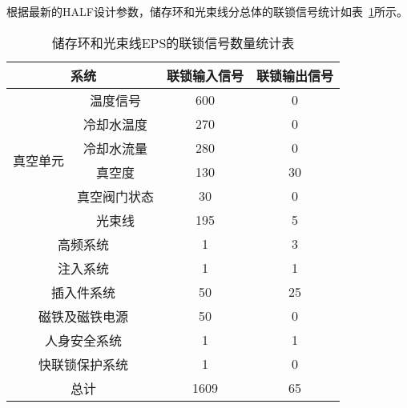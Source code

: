 根据最新的HALF设计参数，储存环和光束线分总体的联锁信号统计如表~\ref{table:4.3}所示。
\begin{table}[hbt]
\centering
\caption{储存环和光束线EPS的联锁信号数量统计表}
\label{table:4.3} 
\begin{tabular}{|c|c|c|c|}
\hline
\multicolumn{2}{|c|}{系统}                            & \multicolumn{1}{l|}{联锁输入信号} & \multicolumn{1}{l|}{联锁输出信号} \\ \hline
\multirow{6}{*}{真空单元} & 温度信号                        & 600                         & 0                           \\ \cline{2-4} 
                      & 冷却水温度                       & 270                         & 0                           \\ \cline{2-4} 
                      & 冷却水流量                       & 280                         & 0                           \\ \cline{2-4} 
                      & 真空度                         & 130                         & 30                          \\ \cline{2-4} 
                      & \multicolumn{1}{l|}{真空阀门状态} & 30                          & 0                           \\ \cline{2-4} 
                      & 光束线                         & 195                         & 5                           \\ \hline
\multicolumn{2}{|c|}{高频系统}                          & 1                           & 3                           \\ \hline
\multicolumn{2}{|c|}{注入系统}                          & 1                           & 1                           \\ \hline
\multicolumn{2}{|c|}{插入件系统}                         & 50                          & 25                          \\ \hline
\multicolumn{2}{|c|}{磁铁及磁铁电源}                       & 50                          & 0                           \\ \hline
\multicolumn{2}{|c|}{人身安全系统}                        & 1                           & 1                           \\ \hline
\multicolumn{2}{|c|}{快联锁保护系统}                       & 1                           & 0                           \\ \hline
\multicolumn{2}{|c|}{总计}                            & 1609                        & 65                          \\ \hline
\end{tabular}
\end{table}

